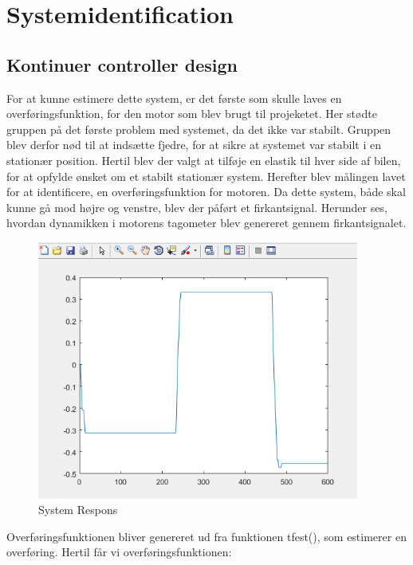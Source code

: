 \graphicspath{{Chapters/Systemforlob/}}

\section{Systemidentification}

\subsection{Kontinuer controller design}

For at kunne estimere dette system, er det første som skulle laves en overføringsfunktion, for den motor som blev brugt til projeketet. Her stødte gruppen på det første problem med systemet, da det ikke var stabilt. Gruppen blev derfor nød til at indsætte fjedre, for at sikre at systemet var stabilt i en stationær position. Hertil blev der valgt at tilføje en elastik til hver side af bilen, for at opfylde ønsket om et stabilt stationær system. 
Herefter blev målingen lavet for at identificere, en overføringsfunktion for motoren. Da dette system, både skal kunne gå mod højre og venstre, blev der påført et firkantsignal. Herunder ses, hvordan dynamikken i motorens tagometer blev genereret gennem firkantsignalet.      
   

\begin{figure}[H]
	\centering
	\includegraphics[width = 300pt]{Img/system_respons}
	\caption{System Respons}
	\label{fig:system_respons}
\end{figure}

Overføringsfunktionen bliver genereret ud fra funktionen tfest(), som estimerer en overføring. Hertil får vi overføringsfunktionen:

